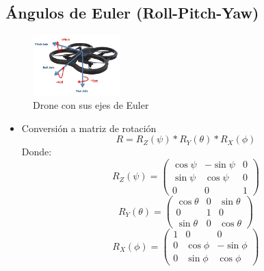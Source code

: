 \documentclass[main.tex]{subfiles}
\begin{document}
\subsection{Ángulos de Euler (Roll-Pitch-Yaw)}
\begin{figure}[h]
  \centering
  \includegraphics[width=0.3\textwidth]{../img/rpy_drone.jpg}
  \caption{Drone con sus ejes de Euler}
  \label{rpy_drone}
\end{figure}

\begin{itemize}
\item Conversión a matriz de rotación
  \begin{equation}
    \label{eq:matriz_Rot}
    R = R_{Z}(\psi) * R_{Y}(\theta) * R_{X}(\phi)
  \end{equation}
  Donde:
  \begin{equation}
    \label{eq:matriz_Rz}
    R_{Z}(\psi) = \begin{pmatrix}
          \cos \psi  & -\sin \psi  &0 \\ 
          \sin \psi &\cos \psi  & 0\\ 
          0&  0& 1
         \end{pmatrix}
  \end{equation}
  \begin{equation}
    \label{eq:matriz_Ry}
    R_{Y}(\theta) = \begin{pmatrix}
           \cos \theta&0&\sin \theta\\ 
           0 &1  &0 \\ 
           \sin \theta &0  & \cos \theta
         \end{pmatrix}
  \end{equation}
  \begin{equation}
    \label{eq:matriz_Rx}
    R_{X}(\phi) = \begin{pmatrix}
           1 &0  &0 \\ 
           0 &\cos \phi&-\sin \phi \\ 
           0 &\sin \phi&\cos \phi 
         \end{pmatrix}
  \end{equation}

\end{itemize}
\end{document}
